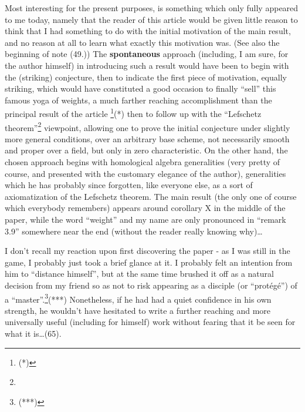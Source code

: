 Most interesting for the present purposes, is something 
which only fully appeared to me today, namely that the reader of this article would be
given little reason to think that I had something to do with the initial motivation of the
main result, and no reason at all to learn what exactly this motivation was. 
(See also the beginning of note (49.))
The \textbf{spontaneous} approach
(including, I am sure, for the author himself)
in introducing such a result would have been to begin with the (striking) conjecture,
then to indicate the first piece of motivation, equally striking, which would have
constituted a good occasion to finally ``sell'' this famous yoga of weights, a much
farther reaching accomplishment than the principal result of the article
\footnote{(*)}(*) then to follow up with the 
``Lefschetz theorem''\footnote{} viewpoint, allowing one to prove the initial conjecture under
slightly more general conditions, over an arbitrary base scheme, not necessarily smooth
and proper over a field, but only in zero characteristic. 
On the other hand, the chosen approach begins with homological algebra generalities
(very pretty of course, and presented with the customary elegance of the author), 
generalities which he has probably since forgotten, like everyone else, 
as a sort of axiomatization of the Lefschetz theorem. The main result (the only one of
course which everybody remembers) appears around corollary X in the middle of the paper, 
while the word ``weight'' and my name are only pronounced in ``remark 3.9'' somewhere near
the end (without the reader really knowing why)\ldots

I don't recall my reaction upon first discovering the paper - as I was still in the game,
I probably just took a brief glance at it. 
I probably felt an intention from him to ``distance himself'', but at the same time brushed it off
as a natural decision from my friend so as not to risk appearing as a disciple
(or ``prot\'eg\'e'')  of a ``master''.\footnote{(***)}(***)
Nonetheless, if he had had a quiet confidence  in his own strength, he wouldn't have
hesitated to write a further reaching and more universally useful (including for himself) work
without fearing that it be seen for what it is\ldots (65).

